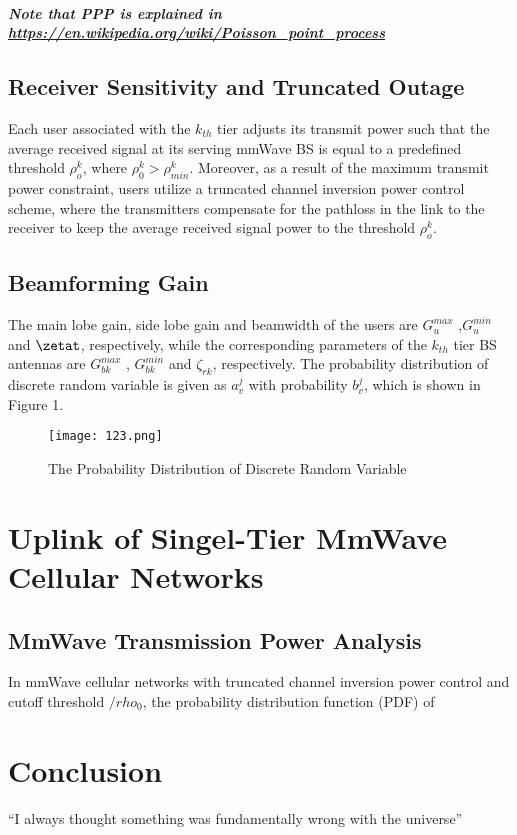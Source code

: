 \documentclass{article}
\begin{document}
\paragraph{\textit{ Note that PPP is explained in \url{https://en.wikipedia.org/wiki/Poisson_point_process}}}

\subsection{Receiver Sensitivity and Truncated Outage}
Each user associated with the $k_{th}$ tier adjusts its transmit power such that the average received signal at its serving mmWave BS is equal to a predefined threshold $\rho^k_o$, where $\rho^k_0 > \rho^k_{min}$. Moreover, as a result of the maximum transmit power constraint, users utilize
a truncated channel inversion power control scheme, where the transmitters compensate for the pathloss in the link to the receiver to keep the average received signal power to the threshold $\rho^k_o$.

\subsection{Beamforming Gain}
The main lobe gain, side lobe gain and beamwidth of the users are $G^{max}_u$ ,$G^{min}_u$ and $\zetat$, respectively, while the corresponding parameters of the $k_{th}$ tier BS antennas are $G^{max}_{bk}$ , $G^{min}_{bk}$ and $\zeta_{rk}$, respectively. The probability distribution of discrete random variable is given as $a^j_v$ with probability $b^j_v$, which is shown in Figure 1.
\begin{figure}[ht]
    \centering
    \texttt{[image: 123.png]}
    \caption{The Probability Distribution of Discrete Random Variable}
    \label{fig:label}
\end{figure}

\section{Uplink of Singel-Tier MmWave Cellular Networks}
\subsection{MmWave Transmission Power Analysis}
In mmWave cellular networks with truncated channel inversion power control and cutoff threshold $/rho_0$, the probability distribution function (PDF) of
\section{Conclusion}
``I always thought something was fundamentally wrong with the universe'' \citep{adams1995hitchhiker}
\end{document}
